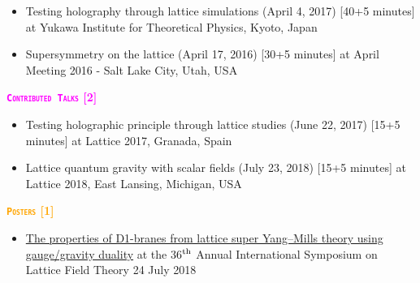 \begin{itemize}
 \item Testing holography through lattice simulations (April 4, 2017) [40+5 minutes]  at Yukawa Institute for Theoretical Physics, Kyoto, Japan
 \href{https://rgjha.github.io/talks/kyoto_v1.pdf}{{\texttt{\COL{[PDF]}}}}
\item Supersymmetry on the lattice (April 17, 2016) [30+5 minutes]  at April Meeting 2016 - Salt Lake City, Utah, USA
\href{https://rgjha.github.io/talks/aps_april.pdf}{{\texttt{}}} 
\end{itemize}

\textcolor{magenta}{\textbf{\textsc{\fontsize{11}{48} \bfseries \texttt{Contributed Talks} [2]}}}
\begin{itemize}
  \item Testing holographic principle through lattice studies (June 22, 2017) [15+5 minutes]  at Lattice 2017, Granada, Spain
  \item Lattice quantum gravity with scalar fields (July 23, 2018) [15+5 minutes]  at Lattice 2018, East Lansing, Michigan, USA   
\end{itemize}
 

\textcolor{orange}{\textbf{\textsc{\fontsize{11}{48} \bfseries \texttt{Posters} [1]}}}
  \begin{itemize}
 \item \href{https://indico.fnal.gov/event/15949/session/4/contribution/66}{The properties of D1-branes from lattice super Yang--Mills theory using gauge/gravity duality} at the 36$^{\rm{th}}$ Annual International Symposium on Lattice Field Theory \hfill 24 July 2018
\end{itemize}
